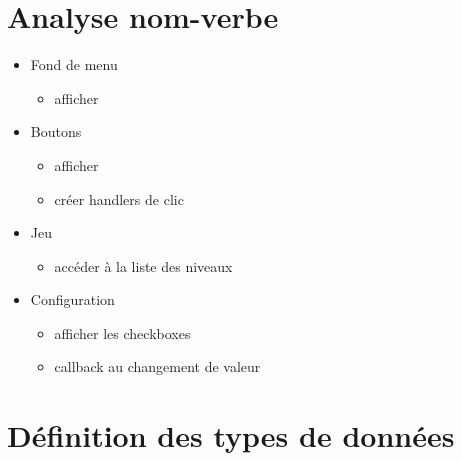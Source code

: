 \documentclass{article}
\begin{document}
\section{Analyse nom-verbe}

\begin{itemize}
\item Fond de menu
  \begin{itemize}
  \item afficher
  \end{itemize}
\item Boutons
  \begin{itemize}
  \item afficher
  \item créer handlers de clic
  \end{itemize}
\item Jeu
  \begin{itemize}
  \item accéder à la liste des niveaux
  \end{itemize}
\item Configuration
  \begin{itemize}
  \item afficher les checkboxes
  \item callback au changement de valeur
  \end{itemize}
\end{itemize}

\newpage
\section{Définition des types de données}
\end{document}
